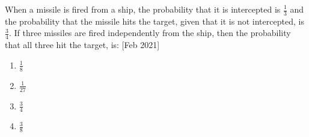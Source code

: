 	\item When a missile is fired from a ship, the probability that it is intercepted is $\frac{1}{3}$ and the probability that the missile hits the target, given that it is not intercepted, is $\frac{3}{4}$. If three missiles are fired independently from the ship, then the probability that all three hit the target, is: \hfill{[Feb 2021]}
		\begin{enumerate}
			\item $\frac{1}{8}$\\
			\item $\frac{1}{27}$\\
			\item $\frac{3}{4}$\\
			\item $\frac{3}{8}$
		\end{enumerate}

